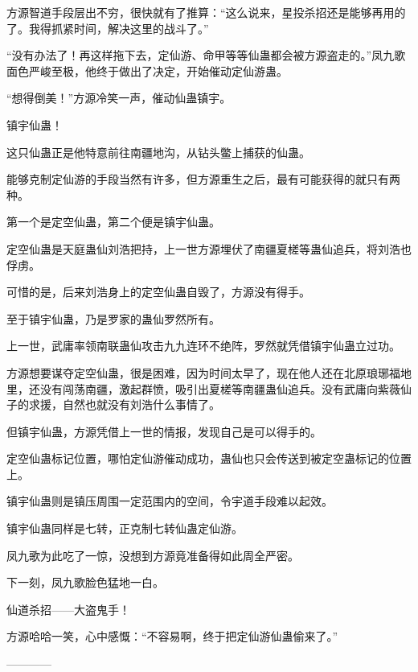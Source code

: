 \begin{this_body}
方源智道手段层出不穷，很快就有了推算：“这么说来，星投杀招还是能够再用的了。我得抓紧时间，解决这里的战斗了。”

“没有办法了！再这样拖下去，定仙游、命甲等等仙蛊都会被方源盗走的。”凤九歌面色严峻至极，他终于做出了决定，开始催动定仙游蛊。

“想得倒美！”方源冷笑一声，催动仙蛊镇宇。

镇宇仙蛊！

这只仙蛊正是他特意前往南疆地沟，从钻头鳖上捕获的仙蛊。

能够克制定仙游的手段当然有许多，但方源重生之后，最有可能获得的就只有两种。

第一个是定空仙蛊，第二个便是镇宇仙蛊。

定空仙蛊是天庭蛊仙刘浩把持，上一世方源埋伏了南疆夏槎等蛊仙追兵，将刘浩也俘虏。

可惜的是，后来刘浩身上的定空仙蛊自毁了，方源没有得手。

至于镇宇仙蛊，乃是罗家的蛊仙罗然所有。

上一世，武庸率领南联蛊仙攻击九九连环不绝阵，罗然就凭借镇宇仙蛊立过功。

方源想要谋夺定空仙蛊，很是困难，因为时间太早了，现在他人还在北原琅琊福地里，还没有闯荡南疆，激起群愤，吸引出夏槎等南疆蛊仙追兵。没有武庸向紫薇仙子的求援，自然也就没有刘浩什么事情了。

但镇宇仙蛊，方源凭借上一世的情报，发现自己是可以得手的。

定空仙蛊标记位置，哪怕定仙游催动成功，蛊仙也只会传送到被定空蛊标记的位置上。

镇宇仙蛊则是镇压周围一定范围内的空间，令宇道手段难以起效。

镇宇仙蛊同样是七转，正克制七转仙蛊定仙游。

凤九歌为此吃了一惊，没想到方源竟准备得如此周全严密。

下一刻，凤九歌脸色猛地一白。

仙道杀招——大盗鬼手！

方源哈哈一笑，心中感慨：“不容易啊，终于把定仙游仙蛊偷来了。”

------------

\end{this_body}

